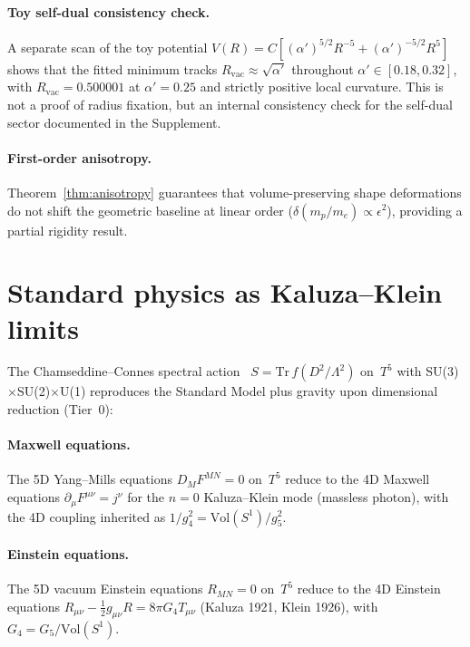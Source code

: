 \documentclass[11pt,a4paper]{article}
\theoremstyle{definition}
\theoremstyle{remark}
\begin{document}
\paragraph{Toy self-dual consistency check.}
A separate scan of the toy potential
$V(R)=C[(\alpha')^{5/2}R^{-5}+(\alpha')^{-5/2}R^5]$ shows that the
fitted minimum tracks $R_{\mathrm{vac}}\approx\sqrt{\alpha'}$ throughout
$\alpha'\in[0.18,0.32]$, with $R_{\mathrm{vac}}=0.500001$ at
$\alpha'=0.25$ and strictly positive local curvature.  This is not a
proof of radius fixation, but an internal consistency check for the
self-dual sector documented in the Supplement.

\paragraph{First-order anisotropy.}
Theorem~\ref{thm:anisotropy} guarantees that volume-preserving shape
deformations do not shift the geometric baseline at linear order
($\delta(m_p/m_e)\propto\epsilon^2$), providing a partial rigidity
result.

\section{Standard physics as Kaluza--Klein limits}
\label{sec:KK}

The Chamseddine--Connes spectral action~\cite{ChamseddineConnes1997}
$S=\mathrm{Tr}\,f(D^2/\Lambda^2)$ on~$T^5$ with SU(3)$\times$SU(2)$\times$U(1)
reproduces the Standard Model plus gravity upon dimensional reduction (Tier~0):

\paragraph{Maxwell equations.}
The 5D Yang--Mills equations $D_M F^{MN}=0$ on~$T^5$ reduce to the
4D Maxwell equations $\partial_\mu F^{\mu\nu}=j^\nu$ for the $n=0$
Kaluza--Klein mode (massless photon), with the 4D coupling inherited as
$1/g_4^2=\mathrm{Vol}(S^1)/g_5^2$.

\paragraph{Einstein equations.}
The 5D vacuum Einstein equations $R_{MN}=0$ on~$T^5$ reduce to
the 4D Einstein equations $R_{\mu\nu}-\tfrac12 g_{\mu\nu}R=8\pi G_4 T_{\mu\nu}$
(Kaluza 1921, Klein 1926), with $G_4=G_5/\mathrm{Vol}(S^1)$.
\end{document}
